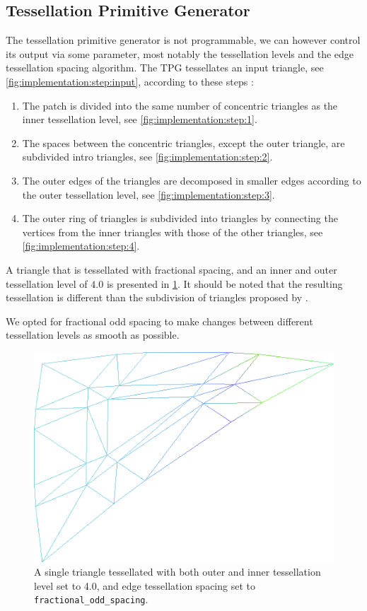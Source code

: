 \subsection{Tessellation Primitive Generator}
\label{ss:implementation:tpg}
	The tessellation primitive generator is not programmable, we can however control its output via some parameter, most notably the tessellation levels and the edge tessellation spacing algorithm. The TPG tessellates an input triangle, see \cref{fig:implementation:step:input}, according to these steps \cite{cozzi2012opengl}:
		\begin{enumerate}[label=(\roman*)]
			\item \label{it:implementation:1} The patch is divided into the same number of concentric triangles as the inner tessellation level, see \cref{fig:implementation:step:1}.
			\item \label{it:implementation:2} The spaces between the concentric triangles, except the outer triangle, are subdivided intro triangles, see \cref{fig:implementation:step:2}.
			\item \label{it:implementation:3} The outer edges of the triangles are decomposed in smaller edges according to the outer tessellation level, see \cref{fig:implementation:step:3}.
			\item \label{it:implementation:4} The outer ring of triangles is subdivided into triangles by connecting the vertices from the inner triangles with those of the other triangles, see \cref{fig:implementation:step:4}.
		\end{enumerate}
	A triangle that is tessellated with fractional spacing, and an inner and outer tessellation level of $4.0$ is presented in \cref{fig:implementation:tessellatedTriangle}. It should be noted that the resulting tessellation is different than the subdivision of triangles proposed by \citeauthor{vlachos2001curved}. 

	We opted for fractional odd spacing to make changes between different tessellation levels as smooth as possible. 

	\begin{figure}
		\centering
		\includegraphics[width=0.5\columnwidth]{content/img/implementation/tesselatedTriangle.png}
		\caption{A single triangle tessellated with both outer and inner tessellation level set to 4.0, and edge tessellation spacing set to \texttt{fractional\_odd\_spacing}.}
		\label{fig:implementation:tessellatedTriangle}
	\end{figure}


